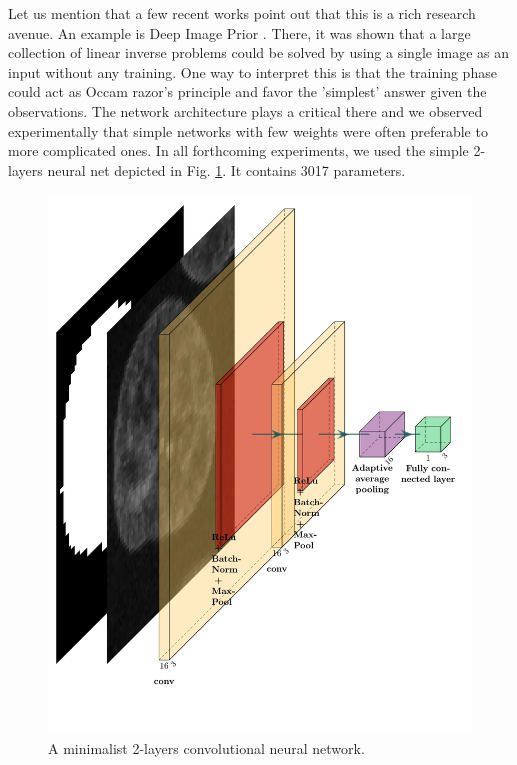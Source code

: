 \documentclass{article}
\begin{document}
Let us mention that a few recent works point out that this is a rich research avenue. 
An example is Deep Image Prior \cite{lempitsky2018deep}. 
There, it was shown that a large collection of linear inverse problems could be solved by using a single image as an input without any training. 
One way to interpret this is that the training phase could act as Occam razor's principle and favor the 'simplest' answer given the observations.
The network architecture plays a critical there and we observed experimentally that simple networks with few weights were often preferable to more complicated ones.
In all forthcoming experiments, we used the simple 2-layers neural net depicted in Fig. \ref{fig:CNN2D}. It contains 3017 parameters.
\begin{figure}[h!]{}
 \centering
 \includegraphics[width=0.5\linewidth]{Figures/myfirstcnn.pdf}
  \caption{A minimalist 2-layers convolutional neural network. \label{fig:CNN2D}}
\end{figure}



\end{document}
